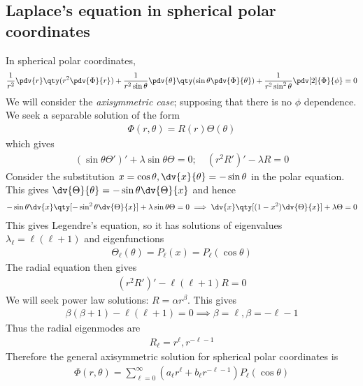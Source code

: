 \subsection{Laplace's equation in spherical polar coordinates}
In spherical polar coordinates,
\begin{align*}
	\frac{1}{r^2} \pdv{r} \qty(r^2 \pdv{\Phi}{r}) + \frac{1}{r^2 \sin\theta}\pdv{\theta} \qty(\sin\theta \pdv{\Phi}{\theta}) + \frac{1}{r^2 \sin^2 \theta} \pdv[2]{\Phi}{\phi} = 0
\end{align*}
We will consider the \textit{axisymmetric case}; supposing that there is no $\phi$ dependence.
We seek a separable solution of the form
\begin{align*}
	\Phi(r,\theta) = R(r) \Theta(\theta)
\end{align*}
which gives
\begin{align*}
	(\sin\theta \Theta')' + \lambda \sin\theta \Theta = 0;\quad (r^2R')' - \lambda R = 0
\end{align*}
Consider the substitution $x = \cos\theta, \dv{x}{\theta} = -\sin\theta$ in the polar equation.
This gives $\dv{\Theta}{\theta} = -\sin\theta \dv{\Theta}{x}$ and hence
\begin{align*}
	-\sin\theta \dv{x}\qty[-\sin^2\theta \dv{\Theta}{x}] + \lambda \sin\theta \Theta = 0 \implies \dv{x}\qty[(1-x^2)\dv{\Theta}{x}] + \lambda \Theta = 0
\end{align*}
This gives Legendre's equation, so it has solutions of eigenvalues $\lambda_\ell = \ell (\ell + 1)$ and eigenfunctions
\begin{align*}
	\Theta_\ell(\theta) = P_\ell(x) = P_\ell(\cos\theta)
\end{align*}
The radial equation then gives
\begin{align*}
	(r^2 R')' - \ell (\ell + 1) R = 0
\end{align*}
We will seek power law solutions: $R = \alpha r^\beta$.
This gives
\begin{align*}
	\beta(\beta + 1) - \ell(\ell + 1) = 0 \implies \beta = \ell, \beta = -\ell - 1
\end{align*}
Thus the radial eigenmodes are
\begin{align*}
	R_\ell = r^{\ell}, r^{-\ell - 1}
\end{align*}
Therefore the general axisymmetric solution for spherical polar coordinates is
\begin{align*}
	\Phi(r,\theta) = \sum_{\ell = 0}^\infty (a_\ell r^{\ell} + b_\ell r^{-\ell - 1}) P_\ell(\cos\theta)
\end{align*}
